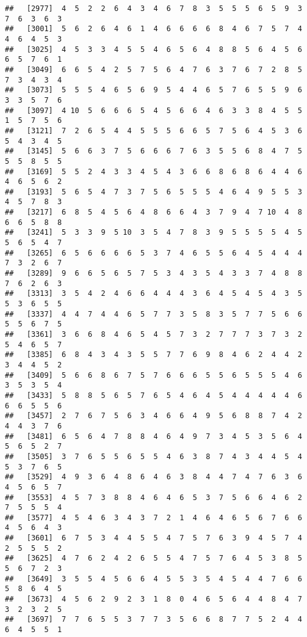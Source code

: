 \documentclass[
]{book}
\begin{document}
\begin{verbatim}
##   [2977]  4  5  2  2  6  4  3  4  6  7  8  3  5  5  5  6  5  9  3  7  6  3  6  3
##   [3001]  5  6  2  6  4  6  1  4  6  6  6  6  8  4  6  7  5  7  4  4  6  4  5  3
##   [3025]  4  5  3  3  4  5  5  4  6  5  6  4  8  8  5  6  4  5  6  6  5  7  6  1
##   [3049]  6  6  5  4  2  5  7  5  6  4  7  6  3  7  6  7  2  8  5  7  3  4  3  4
##   [3073]  5  5  5  4  6  5  6  9  5  4  4  6  5  7  6  5  5  9  6  3  3  5  7  6
##   [3097]  4 10  5  6  6  6  5  4  5  6  6  4  6  3  3  8  4  5  5  1  5  7  5  6
##   [3121]  7  2  6  5  4  4  5  5  5  6  6  5  7  5  6  4  5  3  6  5  4  3  4  5
##   [3145]  5  6  6  3  7  5  6  6  6  7  6  3  5  5  6  8  4  7  5  5  5  8  5  5
##   [3169]  5  5  2  4  3  3  4  5  4  3  6  6  8  6  8  6  4  4  6  4  6  5  6  2
##   [3193]  5  6  5  4  7  3  7  5  6  5  5  5  4  6  4  9  5  5  3  4  5  7  8  3
##   [3217]  6  8  5  4  5  6  4  8  6  6  4  3  7  9  4  7 10  4  8  6  6  5  8  8
##   [3241]  5  3  3  9  5 10  3  5  4  7  8  3  9  5  5  5  5  4  5  5  6  5  4  7
##   [3265]  6  5  6  6  6  6  5  3  7  4  6  5  5  6  4  5  4  4  4  7  3  2  6  7
##   [3289]  9  6  6  5  6  5  7  5  3  4  3  5  4  3  3  7  4  8  8  7  6  2  6  3
##   [3313]  3  5  4  2  4  6  6  4  4  4  3  6  4  5  4  5  4  3  5  5  3  6  5  5
##   [3337]  4  4  7  4  4  6  5  7  7  3  5  8  3  5  7  7  5  6  6  5  5  6  7  5
##   [3361]  3  6  6  8  4  6  5  4  5  7  3  2  7  7  7  3  7  3  2  5  4  6  5  7
##   [3385]  6  8  4  3  4  3  5  5  7  7  6  9  8  4  6  2  4  4  2  3  4  4  5  2
##   [3409]  5  6  6  8  6  7  5  7  6  6  6  5  5  6  5  5  5  4  6  3  5  3  5  4
##   [3433]  5  8  8  5  6  5  7  6  5  4  6  4  5  4  4  4  4  4  6  6  6  5  5  6
##   [3457]  2  7  6  7  5  6  3  4  6  6  4  9  5  6  8  8  7  4  2  4  4  3  7  6
##   [3481]  6  5  6  4  7  8  8  4  6  4  9  7  3  4  5  3  5  6  4  5  6  5  2  7
##   [3505]  3  7  6  5  5  6  5  5  4  6  3  8  7  4  3  4  4  5  4  5  3  7  6  5
##   [3529]  4  9  3  6  4  8  6  4  6  3  8  4  4  7  4  7  6  3  6  4  5  6  5  7
##   [3553]  4  5  7  3  8  8  4  6  4  6  5  3  7  5  6  6  4  6  2  7  5  5  5  4
##   [3577]  4  5  4  6  3  4  3  7  2  1  4  6  4  6  5  6  7  6  6  4  5  6  4  3
##   [3601]  6  7  5  3  4  4  5  5  4  7  5  7  6  3  9  4  5  7  4  2  5  5  5  2
##   [3625]  4  7  6  2  4  2  6  5  5  4  7  5  7  6  4  5  3  8  5  5  6  7  2  3
##   [3649]  3  5  5  4  5  6  6  4  5  5  3  5  4  5  4  4  7  6  6  5  8  6  4  5
##   [3673]  4  5  6  2  9  2  3  1  8  0  4  6  5  6  4  4  8  4  7  3  2  3  2  5
##   [3697]  7  7  6  5  5  3  7  7  3  5  6  6  8  7  7  5  2  4  4  6  4  5  5  1

\end{verbatim}
\end{document}

